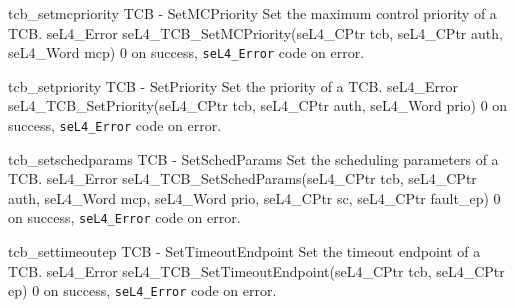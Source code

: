 \apidoc
{tcb_setmcpriority}
{TCB - SetMCPriority}
{Set the maximum control priority of a TCB.}
{seL4_Error seL4_TCB_SetMCPriority(seL4_CPtr tcb, seL4_CPtr auth, seL4_Word mcp)}
{
}
{0 on success, \texttt{seL4_Error} code on error.}

\apidoc
{tcb_setpriority}
{TCB - SetPriority}
{Set the priority of a TCB.}
{seL4_Error seL4_TCB_SetPriority(seL4_CPtr tcb, seL4_CPtr auth, seL4_Word prio)}
{
}
{0 on success, \texttt{seL4_Error} code on error.}

\apidoc
{tcb_setschedparams}
{TCB - SetSchedParams}
{Set the scheduling parameters of a TCB.}
{seL4_Error seL4_TCB_SetSchedParams(seL4_CPtr tcb, seL4_CPtr auth, seL4_Word mcp,
                                       seL4_Word prio, seL4_CPtr sc, seL4_CPtr fault_ep)}
{
}
{0 on success, \texttt{seL4_Error} code on error.}

\apidoc
{tcb_settimeoutep}
{TCB - SetTimeoutEndpoint}
{Set the timeout endpoint of a TCB.}
{seL4_Error seL4_TCB_SetTimeoutEndpoint(seL4_CPtr tcb, seL4_CPtr ep)}
{
}
{0 on success, \texttt{seL4_Error} code on error.}
